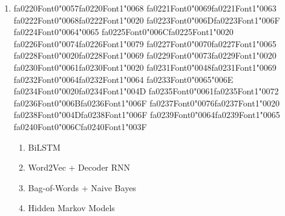 \documentclass[12pt]{article}
\begin{document}
\begin{enumerate}[label=Q\arabic*.]
 \item {\csname fa0220Font0\endcsname\char"0057}{\csname fa0220Font1\endcsname\char"0068} {\csname fa0221Font0\endcsname\char"0069}{\csname fa0221Font1\endcsname\char"0063} {\csname fa0222Font0\endcsname\char"0068}{\csname fa0222Font1\endcsname\char"0020} {\csname fa0223Font0\endcsname\char"006D}{\csname fa0223Font1\endcsname\char"006F} {\csname fa0224Font0\endcsname\char"0064}{\char"0065} {\csname fa0225Font0\endcsname\char"006C}{\csname fa0225Font1\endcsname\char"0020} {\csname fa0226Font0\endcsname\char"0074}{\csname fa0226Font1\endcsname\char"0079} {\csname fa0227Font0\endcsname\char"0070}{\csname fa0227Font1\endcsname\char"0065} {\csname fa0228Font0\endcsname\char"0020}{\csname fa0228Font1\endcsname\char"0069} {\csname fa0229Font0\endcsname\char"0073}{\csname fa0229Font1\endcsname\char"0020} {\csname fa0230Font0\endcsname\char"0061}{\csname fa0230Font1\endcsname\char"0020} {\csname fa0231Font0\endcsname\char"0048}{\csname fa0231Font1\endcsname\char"0069} {\csname fa0232Font0\endcsname\char"0064}{\csname fa0232Font1\endcsname\char"0064} {\csname fa0233Font0\endcsname\char"0065}{\char"006E} {\csname fa0234Font0\endcsname\char"0020}{\csname fa0234Font1\endcsname\char"004D} {\csname fa0235Font0\endcsname\char"0061}{\csname fa0235Font1\endcsname\char"0072} {\csname fa0236Font0\endcsname\char"006B}{\csname fa0236Font1\endcsname\char"006F} {\csname fa0237Font0\endcsname\char"0076}{\csname fa0237Font1\endcsname\char"0020} {\csname fa0238Font0\endcsname\char"004D}{\csname fa0238Font1\endcsname\char"006F} {\csname fa0239Font0\endcsname\char"0064}{\csname fa0239Font1\endcsname\char"0065} {\csname fa0240Font0\endcsname\char"006C}{\csname fa0240Font1\endcsname\char"003F}
 \begin{enumerate}[label=(\Alph*)]
     \item BiLSTM
     \item Word2Vec + Decoder RNN
     \item Bag-of-Words + Naive Bayes
     \item Hidden Markov Models
 \end{enumerate}
 

\end{enumerate}
\end{document}
